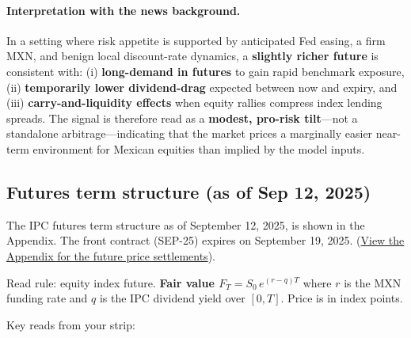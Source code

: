 \documentclass[11pt,a4paper]{article} %
\begin{document}
\paragraph{Interpretation with the news background.} In a setting where risk appetite is supported by anticipated Fed easing, a firm MXN, and benign local discount-rate dynamics, a \textbf{slightly richer future} is consistent with: (i) \textbf{long-demand in futures} to gain rapid benchmark exposure, (ii) \textbf{temporarily lower dividend-drag} expected between now and expiry, and (iii) \textbf{carry-and-liquidity effects} when equity rallies compress index lending spreads. The signal is therefore read as a \textbf{modest, pro-risk tilt}—not a standalone arbitrage—indicating that the market prices a marginally easier near-term environment for Mexican equities than implied by the model inputs.

\subsection{Futures term structure (as of Sep 12, 2025)}

The IPC futures term structure as of September 12, 2025, is shown in the Appendix. The front contract (SEP-25) expires on September 19, 2025. (\hyperref[fig:ipc_settlements]{View the Appendix for the future price settlements}).

Read rule: equity index future. \textbf{Fair value $F_T = S_0\,e^{(r-q)T}$} where $r$ is the MXN funding rate and $q$ is the IPC dividend yield over $[0,T]$. Price is in index points.

Key reads from your strip:
\end{document}
